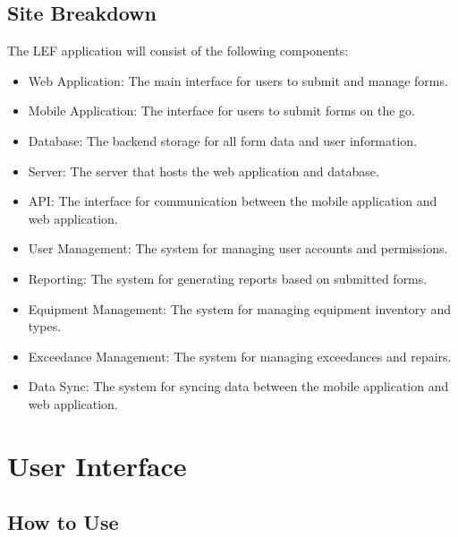 \documentclass[12pt]{article}
\begin{document}
\subsection{Site Breakdown}
The LEF application will consist of the following components:
\begin{itemize}
    \item Web Application: The main interface for users to submit and manage forms.
    \item Mobile Application: The interface for users to submit forms on the go.
    \item Database: The backend storage for all form data and user information.
    \item Server: The server that hosts the web application and database.
    \item API: The interface for communication between the mobile application and web application.
    \item User Management: The system for managing user accounts and permissions.
    \item Reporting: The system for generating reports based on submitted forms.
    \item Equipment Management: The system for managing equipment inventory and types.
    \item Exceedance Management: The system for managing exceedances and repairs.
    \item Data Sync: The system for syncing data between the mobile application and web application.
\end{itemize}
\newpage

\section{User Interface}
\subsection{How to Use}
\end{document}
